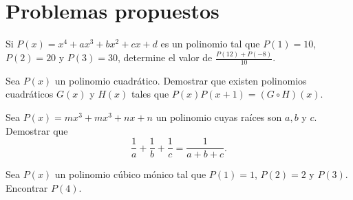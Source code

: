 \section{Problemas propuestos}

\begin{section-problem}
    Si $P(x) = x^4 + ax^3 + bx^2 + cx + d$ es un polinomio tal que $P(1) = 10$, $P(2) = 20$ y $P(3) = 30$, determine el valor de $\frac{P(12) + P(-8)}{10}.$
\end{section-problem}

\begin{section-problem}
    Sea $P(x)$ un polinomio cuadrático. Demostrar que existen polinomios cuadráticos $G(x)$ y $H(x)$ tales que $P(x)P(x+1) = (G \circ H)(x).$
\end{section-problem}

\begin{section-problem}
    Sea $P(x) = mx^3 + mx^3 + nx + n$ un polinomio cuyas raíces son $a, b \mbox{ y } c$. Demostrar que
    \[\frac{1}{a} + \frac{1}{b} + \frac{1}{c} = \frac{1}{a + b + c}.\]
\end{section-problem}

\begin{section-problem}
    Sea $P(x)$ un polinomio cúbico mónico tal que $P(1) = 1$, $P(2) = 2$ y $P(3)$. Encontrar $P(4).$
\end{section-problem}